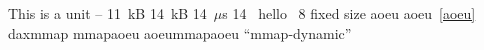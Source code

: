 
This is a unit -- 11~kB 
14~kB
14~$\mu$s  %
14~\us{}
hello~\cite{aoeu}
8\x{}
fixed size
aoeu 
aoeu~\ref{aoeu}
\extfs{}
\xfs{}
\nova{}
\fsync{}
daxmmap
mmapaoeu
aoeummapaoeu
``mmap-dynamic''
